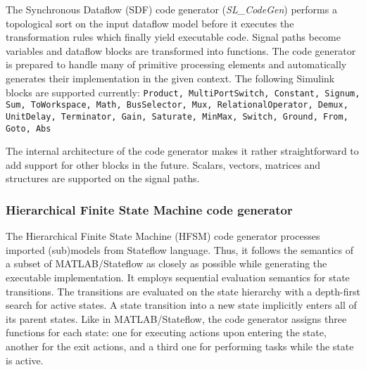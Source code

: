 The Synchronous Dataflow (SDF) code generator (\emph{SL\_CodeGen}) performs a topological sort on the input dataflow model before it executes the transformation rules which finally yield executable code. Signal paths become variables and dataflow blocks are transformed into functions. The code generator is prepared to handle many of primitive processing elements and automatically generates their implementation in the given context. The following Simulink blocks are supported currently: {\tt Product, MultiPortSwitch, Constant, Signum, Sum, ToWorkspace, Math, BusSelector, Mux, RelationalOperator, Demux, UnitDelay, Terminator, Gain, Saturate, MinMax, Switch, Ground, From, Goto, Abs}

The internal architecture of the code generator makes it rather straightforward to add support for other blocks in the future. Scalars, vectors, matrices and structures are supported on the signal paths.

\subsubsection*{Hierarchical Finite State Machine code generator}

The Hierarchical Finite State Machine (HFSM) code generator processes imported (sub)models from Stateflow language. Thus, it follows the semantics of a subset of MATLAB/Stateflow \cite{mathworks:tools} as closely as possible while generating the executable implementation. It employs sequential evaluation semantics for state transitions. The transitions are evaluated on the state hierarchy with a depth-first search for active states. A state transition into a new state implicitly enters all of its parent states. Like in MATLAB/Stateflow, the code generator assigns three functions for each state: one for executing actions upon entering the state, another for the exit actions, and a third one for performing tasks while the state is active.

